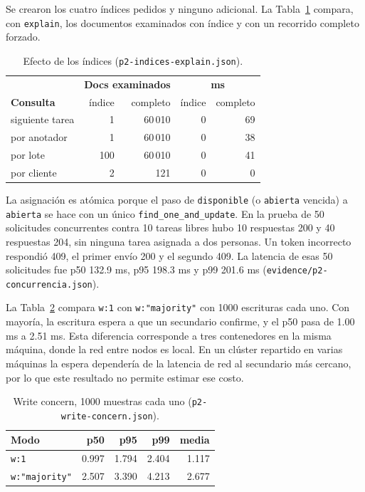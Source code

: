 \documentclass[conference]{IEEEtran}
\begin{document}
Se crearon los cuatro índices pedidos y ninguno adicional. La Tabla~\ref{tab:indices} compara, con \texttt{explain}, los documentos examinados con índice y con un recorrido completo forzado.

\begin{table}[!t]
\caption{Efecto de los índices (\texttt{p2-indices-explain.json}).}
\label{tab:indices}
\centering\footnotesize
\begin{tabular}{@{}l r r r r@{}}
\toprule
& \multicolumn{2}{c}{\textbf{Docs examinados}} & \multicolumn{2}{c}{\textbf{ms}} \\
\textbf{Consulta} & índice & completo & índice & completo \\
\midrule
siguiente tarea & 1 & 60\,010 & 0 & 69 \\
por anotador & 1 & 60\,010 & 0 & 38 \\
por lote & 100 & 60\,010 & 0 & 41 \\
por cliente & 2 & 121 & 0 & 0 \\
\bottomrule
\end{tabular}
\end{table}

La asignación es atómica porque el paso de \texttt{disponible} (o \texttt{abierta} vencida) a \texttt{abierta} se hace con un único \texttt{find\_one\_and\_update}. En la prueba de 50 solicitudes concurrentes contra 10 tareas libres hubo 10 respuestas 200 y 40 respuestas 204, sin ninguna tarea asignada a dos personas. Un token incorrecto respondió 409, el primer envío 200 y el segundo 409. La latencia de esas 50 solicitudes fue p50 132.9 ms, p95 198.3 ms y p99 201.6 ms (\texttt{evidence/p2-concurrencia.json}).

La Tabla~\ref{tab:wc} compara \texttt{w:1} con \texttt{w:"majority"} con 1000 escrituras cada uno. Con mayoría, la escritura espera a que un secundario confirme, y el p50 pasa de 1.00 ms a 2.51 ms. Esta diferencia corresponde a tres contenedores en la misma máquina, donde la red entre nodos es local. En un clúster repartido en varias máquinas la espera dependería de la latencia de red al secundario más cercano, por lo que este resultado no permite estimar ese costo.

\begin{table}[!t]
\caption{Write concern, 1000 muestras cada uno (\texttt{p2-write-concern.json}).}
\label{tab:wc}
\centering\footnotesize
\begin{tabular}{@{}l r r r r@{}}
\toprule
\textbf{Modo} & \textbf{p50} & \textbf{p95} & \textbf{p99} & \textbf{media} \\
\midrule
\texttt{w:1} & 0.997 & 1.794 & 2.404 & 1.117 \\
\texttt{w:"majority"} & 2.507 & 3.390 & 4.213 & 2.677 \\
\bottomrule
\end{tabular}
\end{table}
\end{document}
